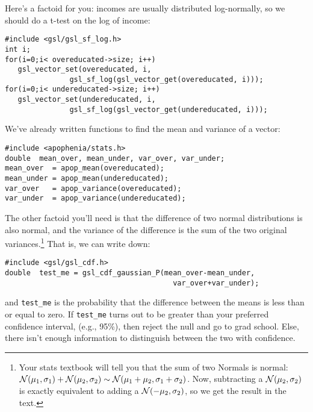 Here's a factoid for you: incomes are usually distributed log-normally, so we should do a t-test on the
log of income:
\begin{verbatim}
#include <gsl/gsl_sf_log.h>
int i;
for(i=0;i< overeducated->size; i++)
   gsl_vector_set(overeducated, i, 
               gsl_sf_log(gsl_vector_get(overeducated, i)));
for(i=0;i< undereducated->size; i++)
   gsl_vector_set(undereducated, i, 
               gsl_sf_log(gsl_vector_get(undereducated, i)));
\end{verbatim}

We've already written functions to find the mean and variance of a vector:

\begin{verbatim}
#include <apophenia/stats.h>
double	mean_over, mean_under, var_over, var_under;
mean_over  = apop_mean(overeducated);
mean_under = apop_mean(undereducated);
var_over   = apop_variance(overeducated);
var_under  = apop_variance(undereducated);
\end{verbatim}

The other factoid you'll need is that the difference of two normal
distributions is also normal, and the variance of the difference is
the sum of the two original variances.\footnote{Your stats textbook
will tell you that the sum of two Normals is normal: ${\cal N}(\mu_1,
\sigma_1) + {\cal N}(\mu_2, \sigma_2) \sim {\cal N}(\mu_1 + \mu_2,
\sigma_1 + \sigma_2)$. Now, subtracting a ${\cal N}(\mu_2, \sigma_2)$
is exactly equivalent to adding a ${\cal N}(-\mu_2, \sigma_2)$, so we
get the result in the text.} That is, we can write down:

\begin{verbatim}
#include <gsl/gsl_cdf.h>
double	test_me = gsl_cdf_gaussian_P(mean_over-mean_under, 
                                       var_over+var_under);
\end{verbatim}

and {\tt test\_me} is the probability that the difference between the
means is less than or equal to zero. If {\tt test\_me} turns out to be greater
than your preferred confidence interval, (e.g., 95\%), then reject the
null and go to grad school. Else, there isn't enough information to
distinguish between the two with confidence.

